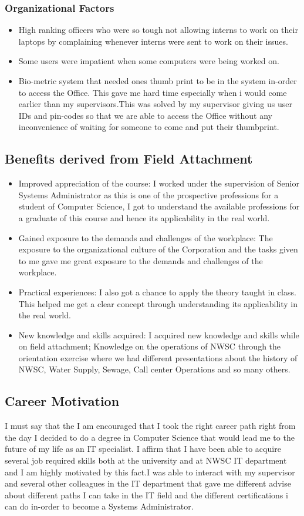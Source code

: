 \documentclass{article}
\begin{document}
\subsubsection{Organizational Factors}
\begin{itemize}
\item High ranking officers who were so tough not allowing interns to work on their laptops by complaining whenever interns were sent to work on their issues.
\item Some users were impatient when some computers were being worked on.
\item Bio-metric system that needed ones thumb print to be in the system in-order to access the Office. This gave me hard time especially when i would come  earlier than my supervisors.This was solved by my supervisor giving us user IDs and pin-codes so that we are able to access the Office without any inconvenience of waiting for someone to come and put their thumbprint.
\end{itemize}
\subsection{Benefits derived from Field Attachment}
\begin{itemize}
\item Improved appreciation of the course: I worked under the supervision of Senior Systems Administrator as this is one of the prospective professions for a student of Computer Science, I got to understand the available professions for a graduate of this course and hence its applicability in the real world.
\item Gained exposure to the demands and challenges of the workplace: The exposure to the organizational culture of the Corporation and the tasks given to me gave me great exposure to the demands and challenges of the workplace.
\item Practical experiences: I also got a chance to apply the theory taught in class. This helped me get a clear concept through understanding its applicability in the real world.
\item New knowledge and skills acquired: I acquired new knowledge and skills while on field attachment; Knowledge on the operations of NWSC through the orientation exercise where we had different presentations about the history of NWSC, Water Supply, Sewage, Call center Operations and so many others.
\end{itemize}
\subsection{Career Motivation}
I must say that the I am encouraged that I took the right career path right from the day I decided to do  a degree in Computer Science that would lead me to the future of my life as an IT specialist. I affirm that I have been able to acquire several job
required skills both at the university and at NWSC IT department  and I am highly motivated by this
fact.I was able to interact with my supervisor and several other colleagues in the IT department that gave me different advise about different paths I can take in the IT field and the different certifications i can do in-order to become a Systems Administrator.
\newpage
\end{document}
